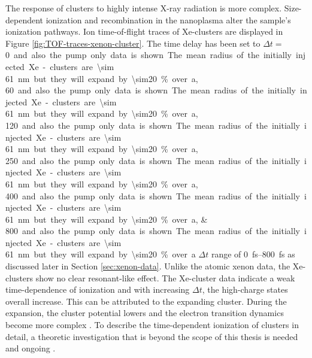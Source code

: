 %
%
%
The response of clusters to highly intense X-ray radiation is more complex. Size-dependent ionization \citep{Schorb-2012-PRL,Schutte-2015-JPhysB} and recombination in the nanoplasma \citep{Schutte-2014-PRL} alter the sample's ionization pathways. Ion time-of-flight traces of Xe-clusters are displayed in Figure \ref{fig:TOF-traces-xenon-cluster}. The time delay has been set to $\Delta t=$\SIlist{0;60;120;250;400;800} and also the pump only data is shown. The mean radius of the initially injected Xe-clusters are \SI{\sim 61}{\nano\meter} but they will expand by \SI{\sim20}{\percent} over a $\Delta t$ range of \SIrange{0}{800}{\femto\second} as discussed later in Section \ref{sec:xenon-data}. Unlike the atomic xenon data, the Xe-clusters show no clear resonant-like effect. The Xe-cluster data indicate a weak time-dependence of ionization and with increasing $\Delta t$, the high-charge states overall increase. This can be attributed to the expanding cluster. During the expansion, the cluster potential lowers \cite{Arbeiter-2011-NJP} and the electron transition dynamics become more complex \cite{Krikunova-2009-NJP}. To describe the time-dependent ionization of clusters in detail, a theoretic investigation that is beyond the scope of this thesis is needed and ongoing \cite{Ho-2016-PC}.
